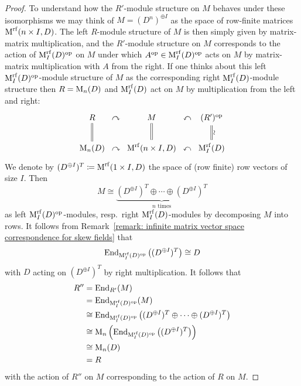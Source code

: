 \begin{proof}
  To understand how the $R'$-module structure on $M$ behaves under these isomorphisms we may think of $M = (D^n)^{\oplus I}$ as the space of row-finite matrices $\operatorname{M}^{{\operatorname{rf}}}(n \times I, D)$.
  The left $R$-module structure of $M$ is then simply given by matrix-matrix multiplication, and the $R'$-module structure on $M$ corresponds to the action of $\operatorname{M}_I^{{\operatorname{rf}}}(D)^{\operatorname{op}}$ on $M$ under which $A^{\operatorname{op}} \in \operatorname{M}_I^{{\operatorname{rf}}}(D)^{\operatorname{op}}$ acts on $M$ by matrix-matrix multiplication with $A$ from the right.
  If one thinks about this left $\operatorname{M}_I^{{\operatorname{rf}}}(D)^{\operatorname{op}}$-module structure of $M$ as the corresponding right $\operatorname{M}_I^{{\operatorname{rf}}}(D)$-module structure then $R = \operatorname{M}_n(D)$ and $\operatorname{M}_I^{{\operatorname{rf}}}(D)$ act on $M$ by multiplication from the left and right:
  \[
    \begin{tikzcd}[column sep = 0em]
        R
        \arrow[equal]{d}
      &\curvearrowright
      & M
        \arrow[equal]{d}
      & \curvearrowleft
      & (R')^\op
        \arrow[equal]{d}[right]{\rotatebox[origin=c]{90}{$\sim$}}
      \\
        \Mat_n(D)
      & \curvearrowright
      & \Mat^{\rf}(n \times I, D)
      & \curvearrowleft
      & \Mat_I^{\rf}(D)
    \end{tikzcd}
  \]
  We denote by $(D^{\oplus I})^T \coloneqq \operatorname{M}^{\operatorname{rf}}(1 \times I, D)$ the space of (row finite) row vectors of size $I$.
  Then
  \[
          M
    \cong \underbrace{ (D^{\oplus I})^T \oplus \dotsb \oplus (D^{\oplus I})^T }_{\text{$n$ times}}
  \]
  as left $\operatorname{M}_I^{{\operatorname{rf}}}(D)^{\operatorname{op}}$-modules, resp.\ right $\operatorname{M}_I^{{\operatorname{rf}}}(D)$-modules by decomposing $M$ into rows.
  It follows from Remark~\ref{remark: infinite matrix vector space correspondence for skew fields} that
  \[
          \operatorname{End}_{ \operatorname{M}_I^{{\operatorname{rf}}}(D)^{\operatorname{op}} }\left( (D^{\oplus I})^T \right) 
    \cong D
  \]
  with $D$ acting on $(D^{\oplus I})^T$ by right multiplication.
  It follows that
  \begin{align*}
            R''
    &=      \operatorname{End}_{R'}(M)  \\
    &=      \operatorname{End}_{ \operatorname{M}_I^{{\operatorname{rf}}}(D)^{\operatorname{op}} }( M )   \\
    &\cong  \operatorname{End}_{ \operatorname{M}_I^{{\operatorname{rf}}}(D)^{\operatorname{op}} }\left( (D^{\oplus I})^T \oplus \dotsb \oplus (D^{\oplus I})^T \right) \\
    &\cong  \operatorname{M}_n\left( \operatorname{End}_{ \operatorname{M}_I^{{\operatorname{rf}}}(D)^{\operatorname{op}} }\left( (D^{\oplus I})^T \right) \right)  \\
    &\cong  \operatorname{M}_n(D) \\
    &=      R
  \end{align*}
  with the action of $R''$ on $M$ corresponding to the action of $R$ on $M$.

\end{proof}
